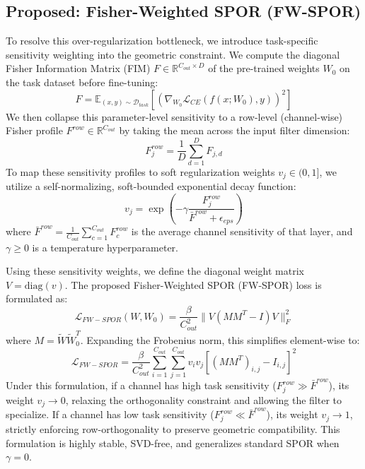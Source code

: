 \documentclass{article}
\theoremstyle{plain}
\theoremstyle{definition}
\theoremstyle{remark}
\begin{document}
\subsection{Proposed: Fisher-Weighted SPOR (FW-SPOR)}
To resolve this over-regularization bottleneck, we introduce task-specific sensitivity weighting into the geometric constraint. We compute the diagonal Fisher Information Matrix (FIM) $F \in \mathbb{R}^{C_{out} \times D}$ of the pre-trained weights $W_0$ on the task dataset before fine-tuning:
\begin{equation}
    F = \mathbb{E}_{(x, y) \sim \mathcal{D}_{task}} \left[ \left( \nabla_{W_0} \mathcal{L}_{CE}(f(x; W_0), y) \right)^2 \right]
\end{equation}
We then collapse this parameter-level sensitivity to a row-level (channel-wise) Fisher profile $F^{row} \in \mathbb{R}^{C_{out}}$ by taking the mean across the input filter dimension:
\begin{equation}
    F^{row}_j = \frac{1}{D} \sum_{d=1}^D F_{j,d}
\end{equation}
To map these sensitivity profiles to soft regularization weights $v_j \in (0, 1]$, we utilize a self-normalizing, soft-bounded exponential decay function:
\begin{equation}
    v_j = \exp \left( -\gamma \frac{F^{row}_j}{\bar{F}^{row} + \epsilon_{eps}} \right)
\end{equation}
where $\bar{F}^{row} = \frac{1}{C_{out}} \sum_{c=1}^{C_{out}} F^{row}_c$ is the average channel sensitivity of that layer, and $\gamma \ge 0$ is a temperature hyperparameter. 

Using these sensitivity weights, we define the diagonal weight matrix $V = \text{diag}(v)$. The proposed Fisher-Weighted SPOR (FW-SPOR) loss is formulated as:
\begin{equation}
    \mathcal{L}_{FW-SPOR}(W, W_0) = \frac{\beta}{C_{out}^2} \| V (M M^T - I) V \|_F^2
\end{equation}
where $M = \tilde{W} \tilde{W}_0^T$. Expanding the Frobenius norm, this simplifies element-wise to:
\begin{equation}
    \mathcal{L}_{FW-SPOR} = \frac{\beta}{C_{out}^2} \sum_{i=1}^{C_{out}} \sum_{j=1}^{C_{out}} v_i v_j \left[ (M M^T)_{i,j} - I_{i,j} \right]^2
\end{equation}
Under this formulation, if a channel has high task sensitivity ($F^{row}_j \gg \bar{F}^{row}$), its weight $v_j \to 0$, relaxing the orthogonality constraint and allowing the filter to specialize. If a channel has low task sensitivity ($F^{row}_j \ll \bar{F}^{row}$), its weight $v_j \to 1$, strictly enforcing row-orthogonality to preserve geometric compatibility. This formulation is highly stable, SVD-free, and generalizes standard SPOR when $\gamma = 0$.
\end{document}
